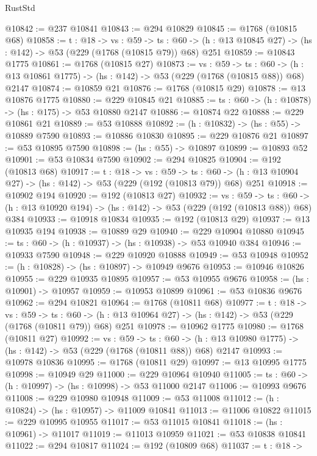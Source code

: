 \begin{lexlean}{RustStd}
\begin{coremodule}
@10842 := @237 @10841
@10843 := @294 @10829
@10845 := @1768 (@10815 @68)
@10858 := {t : @18} ->
  {vs : @59} ->
  {ts : @60} -> (h : @13 @10845 @27) -> (hs : @142) -> @53 (@229 (@1768 (@10815 @79)) @68) @251
@10859 := @10843 @1775
@10861 := @1768 (@10815 @27)
@10873 := {vs : @59} ->
  {ts : @60} -> (h : @13 @10861 @1775) -> (hs : @142) -> @53 (@229 (@1768 (@10815 @88)) @68) @2147
@10874 := @10859 @21
@10876 := @1768 (@10815 @29)
@10878 := @13 @10876 @1775
@10880 := @229 @10845 @21
@10885 := {ts : @60} -> (h : @10878) -> (hs : @175) -> @53 @10880 @2147
@10886 := @10874 @22
@10888 := @229 @10861 @21
@10889 := @53 @10888
@10892 := (h : @10832) -> (hs : @55) -> @10889 @7590
@10893 := @10886 @10830
@10895 := @229 @10876 @21
@10897 := @53 @10895 @7590
@10898 := (hs : @55) -> @10897
@10899 := @10893 @52
@10901 := @53 @10834 @7590
@10902 := @294 @10825
@10904 := @192 (@10813 @68)
@10917 := {t : @18} ->
  {vs : @59} ->
  {ts : @60} -> (h : @13 @10904 @27) -> (hs : @142) -> @53 (@229 (@192 (@10813 @79)) @68) @251
@10918 := @10902 @194
@10920 := @192 (@10813 @27)
@10932 := {vs : @59} ->
  {ts : @60} -> (h : @13 @10920 @194) -> (hs : @142) -> @53 (@229 (@192 (@10813 @88)) @68) @384
@10933 := @10918 @10834
@10935 := @192 (@10813 @29)
@10937 := @13 @10935 @194
@10938 := @10889 @29
@10940 := @229 @10904 @10880
@10945 := {ts : @60} -> (h : @10937) -> (hs : @10938) -> @53 @10940 @384
@10946 := @10933 @7590
@10948 := @229 @10920 @10888
@10949 := @53 @10948
@10952 := (h : @10828) -> (hs : @10897) -> @10949 @9676
@10953 := @10946 @10826
@10955 := @229 @10935 @10895
@10957 := @53 @10955 @9676
@10958 := (hs : @10901) -> @10957
@10959 := @10953 @10899
@10961 := @53 @10836 @9676
@10962 := @294 @10821
@10964 := @1768 (@10811 @68)
@10977 := {t : @18} ->
  {vs : @59} ->
  {ts : @60} -> (h : @13 @10964 @27) -> (hs : @142) -> @53 (@229 (@1768 (@10811 @79)) @68) @251
@10978 := @10962 @1775
@10980 := @1768 (@10811 @27)
@10992 := {vs : @59} ->
  {ts : @60} -> (h : @13 @10980 @1775) -> (hs : @142) -> @53 (@229 (@1768 (@10811 @88)) @68) @2147
@10993 := @10978 @10836
@10995 := @1768 (@10811 @29)
@10997 := @13 @10995 @1775
@10998 := @10949 @29
@11000 := @229 @10964 @10940
@11005 := {ts : @60} -> (h : @10997) -> (hs : @10998) -> @53 @11000 @2147
@11006 := @10993 @9676
@11008 := @229 @10980 @10948
@11009 := @53 @11008
@11012 := (h : @10824) -> (hs : @10957) -> @11009 @10841
@11013 := @11006 @10822
@11015 := @229 @10995 @10955
@11017 := @53 @11015 @10841
@11018 := (hs : @10961) -> @11017
@11019 := @11013 @10959
@11021 := @53 @10838 @10841
@11022 := @294 @10817
@11024 := @192 (@10809 @68)
@11037 := {t : @18} ->

\end{coremodule}
\end{lexlean}
